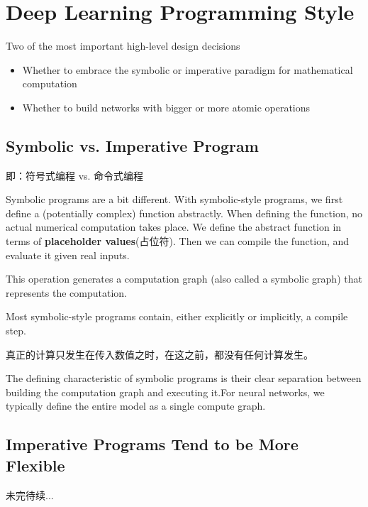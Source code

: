 \section{Deep Learning Programming Style}

Two of the most important high-level design decisions

\begin{itemize}
\item Whether to embrace the symbolic or imperative paradigm for mathematical computation

\item Whether to build networks with bigger or more atomic operations
\end{itemize}

\subsection{Symbolic vs. Imperative Program}

即：符号式编程 vs. 命令式编程

Symbolic programs are a bit different. With symbolic-style programs, we first define a (potentially complex) function abstractly. When defining the function, no actual numerical computation takes place. We define the abstract function in terms of \textbf{placeholder values}(占位符). Then we can compile the function, and evaluate it given real inputs. 

This operation generates a computation graph (also called a symbolic graph) that represents the computation.

Most symbolic-style programs contain, either explicitly or implicitly, a compile step. 

真正的计算只发生在传入数值之时，在这之前，都没有任何计算发生。

The defining characteristic of symbolic programs is their clear separation between building the computation graph and executing it.For neural networks, we typically define the entire model as a single compute graph.

\subsection{Imperative Programs Tend to be More Flexible}

未完待续...




